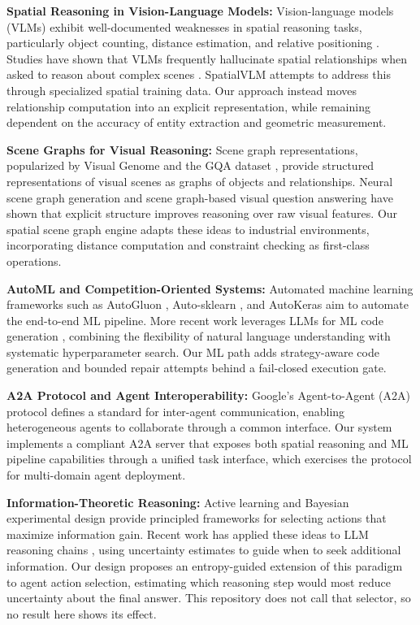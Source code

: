 \documentclass{article}
\begin{document}
\textbf{Spatial Reasoning in Vision-Language Models:}
Vision-language models (VLMs) exhibit well-documented weaknesses in spatial reasoning tasks, particularly object counting, distance estimation, and relative positioning \citep{liu2024llava, chen2024spatialvlm}. Studies have shown that VLMs frequently hallucinate spatial relationships when asked to reason about complex scenes \citep{li2023evaluating}. SpatialVLM \citep{chen2024spatialvlm} attempts to address this through specialized spatial training data. Our approach instead moves relationship computation into an explicit representation, while remaining dependent on the accuracy of entity extraction and geometric measurement.
\smallskip

\textbf{Scene Graphs for Visual Reasoning:}
Scene graph representations, popularized by Visual Genome \citep{krishna2017visual} and the GQA dataset \citep{hudson2019gqa}, provide structured representations of visual scenes as graphs of objects and relationships. Neural scene graph generation \citep{xu2017scenegraph} and scene graph-based visual question answering \citep{hildebrandt2020scene} have shown that explicit structure improves reasoning over raw visual features. Our spatial scene graph engine adapts these ideas to industrial environments, incorporating distance computation and constraint checking as first-class operations.
\smallskip

\textbf{AutoML and Competition-Oriented Systems:}
Automated machine learning frameworks such as AutoGluon \citep{erickson2020autogluon}, Auto-sklearn \citep{feurer2019autosklearn}, and AutoKeras \citep{jin2023autokeras} aim to automate the end-to-end ML pipeline. More recent work leverages LLMs for ML code generation \citep{hollmann2024llmautoml}, combining the flexibility of natural language understanding with systematic hyperparameter search. Our ML path adds strategy-aware code generation and bounded repair attempts behind a fail-closed execution gate.
\smallskip

\textbf{A2A Protocol and Agent Interoperability:}
Google's Agent-to-Agent (A2A) protocol \citep{google2024a2a} defines a standard for inter-agent communication, enabling heterogeneous agents to collaborate through a common interface. Our system implements a compliant A2A server that exposes both spatial reasoning and ML pipeline capabilities through a unified task interface, which exercises the protocol for multi-domain agent deployment.
\smallskip

\textbf{Information-Theoretic Reasoning:}
Active learning \citep{settles2009active} and Bayesian experimental design \citep{chaloner1995bayesian} provide principled frameworks for selecting actions that maximize information gain. Recent work has applied these ideas to LLM reasoning chains \citep{xie2024active}, using uncertainty estimates to guide when to seek additional information. Our design proposes an entropy-guided extension of this paradigm to agent action selection, estimating which reasoning step would most reduce uncertainty about the final answer. This repository does not call that selector, so no result here shows its effect.
\end{document}
